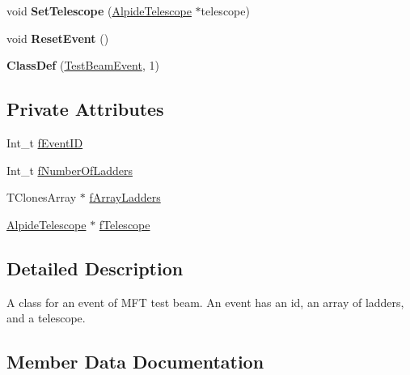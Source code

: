 \begin{DoxyCompactItemize}
\item 
\mbox{\label{class_test_beam_event_a984f80797e7e21291c5259013e6d15f0}} 
void {\bfseries Set\+Telescope} (\mbox{\hyperlink{class_alpide_telescope}{Alpide\+Telescope}} $\ast$telescope)
\item 
\mbox{\label{class_test_beam_event_a8f69ed0160b21ddb51aeac4f1c8f362e}} 
void {\bfseries Reset\+Event} ()
\item 
\mbox{\label{class_test_beam_event_a3d25446f0ca8fb7a11a69d0084e5fdfc}} 
{\bfseries Class\+Def} (\mbox{\hyperlink{class_test_beam_event}{Test\+Beam\+Event}}, 1)
\end{DoxyCompactItemize}
\subsection*{Private Attributes}
\begin{DoxyCompactItemize}
\item 
Int\+\_\+t \mbox{\hyperlink{class_test_beam_event_a1282488fec26d6b83901407e75378dda}{f\+Event\+ID}}
\item 
Int\+\_\+t \mbox{\hyperlink{class_test_beam_event_aca631326d6c05616a55cc16349c8b339}{f\+Number\+Of\+Ladders}}
\item 
T\+Clones\+Array $\ast$ \mbox{\hyperlink{class_test_beam_event_ae24662632a14f052415b9b7eb76e31d6}{f\+Array\+Ladders}}
\item 
\mbox{\hyperlink{class_alpide_telescope}{Alpide\+Telescope}} $\ast$ \mbox{\hyperlink{class_test_beam_event_ade24f88970804477d66d35d6e5acfb98}{f\+Telescope}}
\end{DoxyCompactItemize}


\subsection{Detailed Description}
A class for an event of M\+FT test beam. An event has an id, an array of ladders, and a telescope. 

\subsection{Member Data Documentation}
\mbox{\label{class_test_beam_event_ae24662632a14f052415b9b7eb76e31d6}} 
